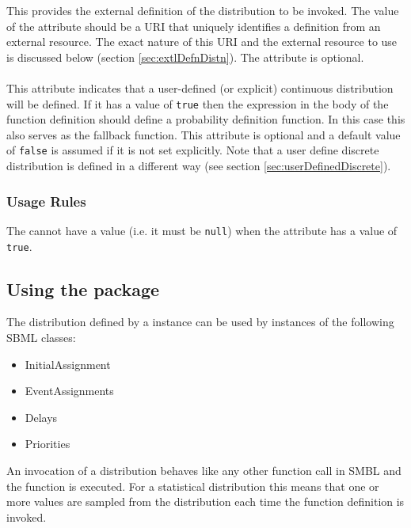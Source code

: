 \documentclass[draftspec]{sbmlpkgspec}
\begin{document}
This provides the external definition of the distribution to be
invoked. The value of the attribute should be a URI that
uniquely identifies a definition from an external resource. The exact
nature of this URI and the external resource to use is discussed below
(section \ref{sec:extlDefnDistn}). The attribute is optional.

\paragraph{}

This attribute indicates that a user-defined (or explicit) continuous
distribution will be defined. If it has a value of \texttt{true} then
the \mathml expression in the body of the function definition should
define a probability definition function. In this case this also
serves as the fallback function. This attribute is optional and a
default value of \texttt{false} is assumed if it is not set
explicitly. Note that a user define discrete distribution is defined
in a different way (see section \ref{sec:userDefinedDiscrete}).

\subsubsection{Usage Rules}

The  cannot have a value (i.e.\xspace it must be
\texttt{null}) when the  attribute has a value of
\texttt{true}.

\subsection{Using the \distribshort package}

The distribution defined by a \FunctionDefinition instance can be
used by instances of the following SBML classes:

\begin{itemize}
  \item InitialAssignment
  \item EventAssignments
  \item Delays
  \item Priorities
\end{itemize}

An invocation of a distribution behaves like any other function call
in SMBL and the function is executed. For a statistical distribution
this means that one or more values are sampled from the distribution
each time the function definition is invoked.
\end{document}
